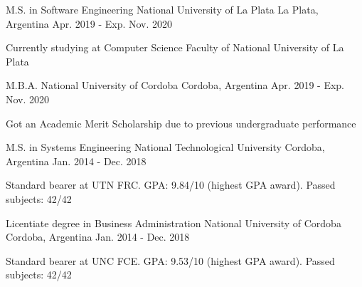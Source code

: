 

\begin{cventries}

  \cventry
    {M.S. in Software Engineering} %
    {National University of La Plata} %
    {La Plata, Argentina} %
    {Apr. 2019 - Exp. Nov. 2020} %
    {
      \begin{cvitems} %
        \item {Currently studying at Computer Science Faculty of National University of La Plata}
      \end{cvitems}
    }

  \cventry
    {M.B.A.} %
    {National University of Cordoba} %
    {Cordoba, Argentina} %
    {Apr. 2019 - Exp. Nov. 2020} %
    {
      \begin{cvitems} %
        \item {Got an Academic Merit Scholarship due to previous undergraduate performance}
      \end{cvitems}
    }

  \cventry
    {M.S. in Systems Engineering} %
    {National Technological University} %
    {Cordoba, Argentina} %
    {Jan. 2014 - Dec. 2018} %
    {
      \begin{cvitems} %
        \item {Standard bearer at UTN FRC. GPA: 9.84/10 (highest GPA award). Passed subjects: 42/42}
      \end{cvitems}
    }

  \cventry
    {Licentiate degree in Business Administration} %
    {National University of Cordoba} %
    {Cordoba, Argentina} %
    {Jan. 2014 - Dec. 2018} %
    {
      \begin{cvitems} %
        \item {Standard bearer at UNC FCE. GPA: 9.53/10 (highest GPA award). Passed subjects: 42/42}
      \end{cvitems}
    }

\end{cventries}
